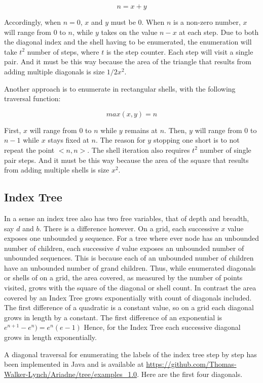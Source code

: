 \documentclass{article}
\begin{document}
	\[n = x + y\]
	
	Accordingly, when \(n = 0\), \(x\) and \(y\) must be \(0\). When \(n\) is a non-zero number, \(x\) will range from \(0\) to \(n\), while \(y\) takes on the value \(n - x\) at each step. Due to both the diagonal index and the shell having to be enumerated, the enumeration will take \(t^2\) number of steps, where \(t\) is the step counter. Each step will visit a single pair.  And it must be this way because the area of the triangle that results from adding multiple diagonals is size \(1/2 x^2\).
	
 	Another approach is to enumerate in rectangular shells, with the following traversal function:
 	
 	\[max(x, y) = n\]
 	
 	First, \( x \) will range from \( 0 \) to \( n \) while \( y \) remains at \( n \). Then, \( y \) will range from \( 0 \) to \( n − 1 \) while \( x \) stays fixed at \( n \). The reason for \( y \) stopping one short is to not repeat the point \( <n, n> \).  The shell iteration also requires \(t^2\) number of single pair steps.  And it must be this way because the area of the square that results from adding multiple shells is size \(x^2\).
 
   	\subsection{Index Tree}

   In a sense an index tree also has two free variables, that of depth and breadth, say \(d\) and \(b\).  There is a difference however. On a grid, each successive \(x\) value exposes one unbounded \(y\) sequence. For a tree where ever node has an unbounded number of children,  each successive \(d\) value exposes an unbounded number of unbounded sequences. This is because each of an unbounded number of children  have an unbounded number of grand children.  Thus, while enumerated diagonals or shells of on a grid, the area covered, as measured by the number of points visited, grows with the square of the diagonal or shell count. In contrast the area covered by an Index Tree grows exponentially with count of diagonals included.  The first difference of a quadratic is a constant value, so on a grid each diagonal grows in length by a constant.  The first difference of an exponential is \(e^{n+1} - e^n) = e^n( e - 1)\) Hence, for the Index Tree each successive diagonal grows in length exponentially.
   
   A diagonal traversal for enumerating the labels of the index tree step by step has been implemented in Java and is available at \url{https://github.com/Thomas-Walker-Lynch/Ariadne/tree/examples_1.0}.  Here are the first four diagonals.
   
\end{document}
